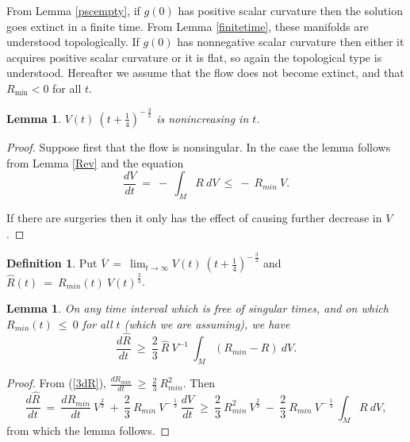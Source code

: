 \documentclass[12pt]{amsart}
\numberwithin{equation}{section}
\theoremstyle{plain}
\newtheorem{lemma}[equation]{Lemma}
\theoremstyle{definition}
\newtheorem{definition}[equation]{Definition}
\theoremstyle{remark}
\begin{document}
From Lemma \ref{pscempty}, if 
$g(0)$ has positive scalar curvature then the solution goes extinct
in a finite time.  From Lemma \ref{finitetime}, these manifolds are understood
topologically. If $g(0)$ has nonnegative scalar curvature then
either it acquires positive scalar curvature or it is flat, so again
the topological type is understood.
Hereafter we assume that the flow
does not become extinct, and 
that $R_{\min}<0$ for all $t$. 

\begin{lemma}
$V(t) \: \left( t + \frac14 \right)^{- \: \frac32}$ is nonincreasing in $t$.
\end{lemma}
\begin{proof}
Suppose first that the flow is nonsingular. In the case the lemma follows
from Lemma \ref{Rev} and the equation 
\begin{equation} \label{dVdt}
\frac{dV}{dt} \: = \: - \: \int_M R \: dV \: \le \: - \: R_{min} \: V.
\end{equation}

If there are surgeries then it only has the effect of causing further
decrease in $V$.
\end{proof}

\begin{definition} \label{VR}
Put $\overline{V} \: = \: \lim_{t \rightarrow \infty} V(t) \: \left( t + \frac14 \right)^{- \: \frac32}$
and $\hat{R}(t) \: = \: R_{min}(t) \: V(t)^{\frac23}$.
\end{definition}

\begin{lemma} \label{Rhatev}
On any time interval which is free of singular times,
and on which   $R_{min}(t) \: \le \: 0$ for all $t$
(which we are assuming), we have
\begin{equation} \label{Rhat}
\frac{d\hat{R}}{dt} \: \ge \: \frac23 \: \hat{R} \: V^{-1} \:
\int_M (R_{min} - R) \: dV.
\end{equation}
\end{lemma}
\begin{proof}
From (\ref{3dR}), $\frac{dR_{min}}{dt} \: \ge \: \frac23 \: R_{min}^2$.
Then
\begin{equation} 
\frac{d\hat{R}}{dt} \: =\: \frac{dR_{min}}{dt} \: V^{\frac23} \: + \:
\frac23 \: R_{min} \: V^{- \: \frac13} \: \frac{dV}{dt} \: \ge \:
\frac23 \: R_{min}^2 \: V^{\frac23} \: - \:
\frac23 \: R_{min} \: V^{- \: \frac13} \: \int_M R \: dV,
\end{equation}
from which the lemma follows.
\end{proof}
\end{document}

